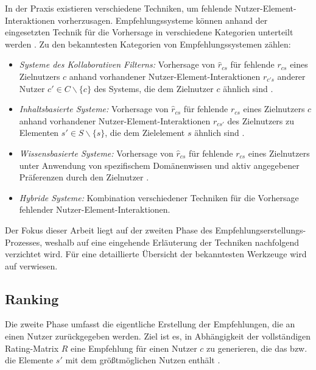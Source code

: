 In der Praxis existieren verschiedene Techniken, um fehlende Nutzer-Ele\-ment-Interaktionen vorherzusagen.
Empfehlungssysteme können anhand der eingesetzten Technik für die Vorhersage in verschiedene Kategorien unterteilt werden \cite[S. 8 ff.]{recommenderSystems:2016}.
Zu den bekanntesten Kategorien von Empfehlungssystemen zählen:
\begin{itemize}
	\item \textit{Systeme des Kollaborativen Filterns:} Vorhersage von $\hat{r}_{cs}$ für fehlende $r_{cs}$ eines Zielnutzers $c$ anhand vorhandener Nutzer-Ele\-ment-Interaktionen $r_{c's}$ anderer Nutzer $c' \in C \backslash \{c\}$ des Systems, die dem Zielnutzer $c$ ähnlich sind \cite[S. 737]{adomavicius:inproceedings}.
	\item \textit{Inhaltsbasierte Systeme:} Vorhersage von $\hat{r}_{cs}$ für fehlende $r_{cs}$ eines Zielnutzers $c$ anhand vorhandener Nutzer-Ele\-ment-Interaktionen $r_{cs'}$ des Zielnutzers zu Elementen $s' \in S \backslash \{s\}$, die dem Zielelement $s$ ähnlich sind \cite[S. 735]{adomavicius:inproceedings}.
	\item \textit{Wissensbasierte Systeme:} Vorhersage von $\hat{r}_{cs}$ für fehlende $r_{cs}$ eines Zielnutzers unter Anwendung von spezifischem Domänenwissen und aktiv angegebener Präferenzen durch den Zielnutzer \cite[S. 16f.]{recommenderSystems:2016}.
	\item \textit{Hybride Systeme:} Kombination verschiedener Techniken für die Vorhersage fehlender Nutzer-Element-Interaktionen.
\end{itemize}

Der Fokus dieser Arbeit liegt auf der zweiten Phase des Empfehlungserstel\-lungs-Prozesses, weshalb auf eine eingehende Erläuterung der Techniken nachfolgend verzichtet wird.
Für eine detaillierte Übersicht der bekanntesten Werkzeuge wird auf \textcite[S. 8ff.]{recommenderSystems:2016} verwiesen.

\subsection{Ranking}
\label{ch:empfehlungssysteme:empfehlungserstellung:recommendation}
Die zweite Phase umfasst die eigentliche Erstellung der Empfehlungen, die an einen Nutzer zurückgegeben werden.
Ziel ist es, in Abhängigkeit der vollständigen Rating-Matrix $R$ eine Empfehlung für einen Nutzer $c$ zu generieren, die das bzw. die Elemente $s'$ mit dem größtmöglichen Nutzen enthält \cite[S. 87]{ekstrand:article}\cite[S. 898]{adomavicius:article}.

